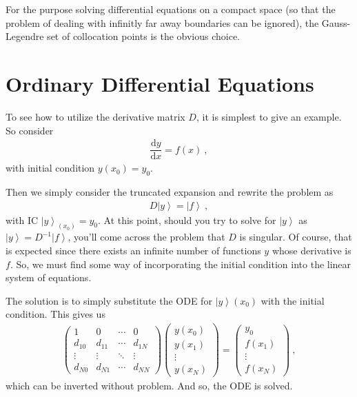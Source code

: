 \documentclass[11pt]{amsdtx}
\newcommand{\ud}{\mathrm{d}}
\newcommand{\ket}[1]{\left| #1 \right\rangle}
\begin{document}
For the purpose solving differential equations on a compact space (so that the problem of dealing with infinitly far away boundaries can be ignored), the Gauss-Legendre set of collocation points is the obvious choice.

\section{Ordinary Differential Equations}

To see how to utilize the derivative matrix $D$, it is simplest to give an example.  So consider
\begin{eqnarray}
	\dfrac{\ud y}{\ud x} = f(x)	~,
\end{eqnarray}
with initial condition $y(x_0) = y_0$.

Then we simply consider the truncated expansion and rewrite the problem as
\begin{eqnarray}
	D \ket{y} = \ket{f}~,
\end{eqnarray}
with IC $\ket{y}_{(x_0)} = y_0$.  At this point, should you try to solve for $\ket{y}$ as $\ket{y} = D^{-1}\ket{f}$, you'll come across the problem that $D$ is singular.  Of course, that is expected since there exists an infinite number of functions $y$ whose derivative is $f$.  So, we must find some way of incorporating the initial condition into the linear system of equations.  

The solution is to simply substitute the ODE for $\ket{y}(x_0)$ with the initial condition.  This gives us
\begin{eqnarray}
	\begin{pmatrix}
		1    & 0 & \cdots & 0 \\
		d_{10} & d_{11} & \cdots & d_{1N} \\
		\vdots & \vdots & \ddots & \vdots \\
		d_{N0} & d_{N1} & \cdots & d_{NN}
	\end{pmatrix}
	\begin{pmatrix}
		y(x_0) \\ y(x_1) \\ \vdots \\ y(x_N)
	\end{pmatrix}
	=
	\begin{pmatrix}
		y_0 \\ f(x_1) \\ \vdots \\ f(x_N)
	\end{pmatrix}~,
\end{eqnarray}
which can be inverted without problem.  And so, the ODE is solved.
\end{document}
